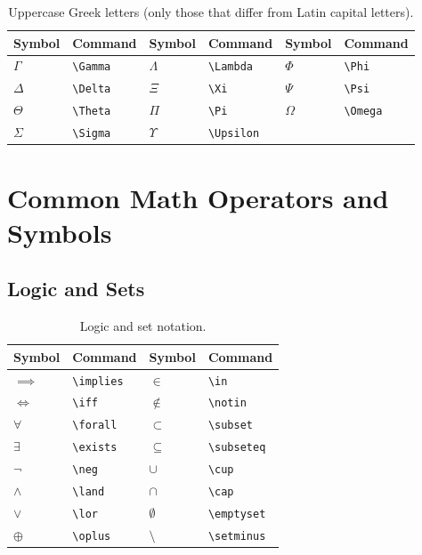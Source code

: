\begin{table}[H]
	\centering
	\caption{Uppercase Greek letters (only those that differ from Latin capital letters).}
	\label{tab:greek-upper}
	\begin{tabular}{@{}llllll@{}}
		\toprule
		Symbol & Command & Symbol & Command & Symbol & Command \\
		\midrule
		$\Gamma$  & \texttt{\textbackslash Gamma}   & $\Lambda$  & \texttt{\textbackslash Lambda}  & $\Phi$    & \texttt{\textbackslash Phi}    \\
		$\Delta$  & \texttt{\textbackslash Delta}   & $\Xi$      & \texttt{\textbackslash Xi}      & $\Psi$    & \texttt{\textbackslash Psi}    \\
		$\Theta$  & \texttt{\textbackslash Theta}   & $\Pi$      & \texttt{\textbackslash Pi}      & $\Omega$  & \texttt{\textbackslash Omega}  \\
		$\Sigma$  & \texttt{\textbackslash Sigma}   & $\Upsilon$ & \texttt{\textbackslash Upsilon} &           &                                \\
		\bottomrule
	\end{tabular}
\end{table}

\newpage
\section{Common Math Operators and Symbols}

\subsection{Logic and Sets}
\begin{table}[H]
	\centering
	\caption{Logic and set notation.}
	\label{tab:symbols-logic}
	\begin{tabular}{@{}llll@{}}
		\toprule
		Symbol & Command & Symbol & Command \\
		\midrule
		$\implies$   & \texttt{\textbackslash implies}   & $\in$       & \texttt{\textbackslash in}       \\
		$\iff$       & \texttt{\textbackslash iff}       & $\notin$    & \texttt{\textbackslash notin}    \\
		$\forall$    & \texttt{\textbackslash forall}    & $\subset$   & \texttt{\textbackslash subset}   \\
		$\exists$    & \texttt{\textbackslash exists}    & $\subseteq$ & \texttt{\textbackslash subseteq} \\
		$\neg$       & \texttt{\textbackslash neg}       & $\cup$      & \texttt{\textbackslash cup}      \\
		$\land$      & \texttt{\textbackslash land}      & $\cap$      & \texttt{\textbackslash cap}      \\
		$\lor$       & \texttt{\textbackslash lor}       & $\emptyset$ & \texttt{\textbackslash emptyset} \\
		$\oplus$     & \texttt{\textbackslash oplus}     & $\setminus$ & \texttt{\textbackslash setminus} \\
		\bottomrule
	\end{tabular}
\end{table}

